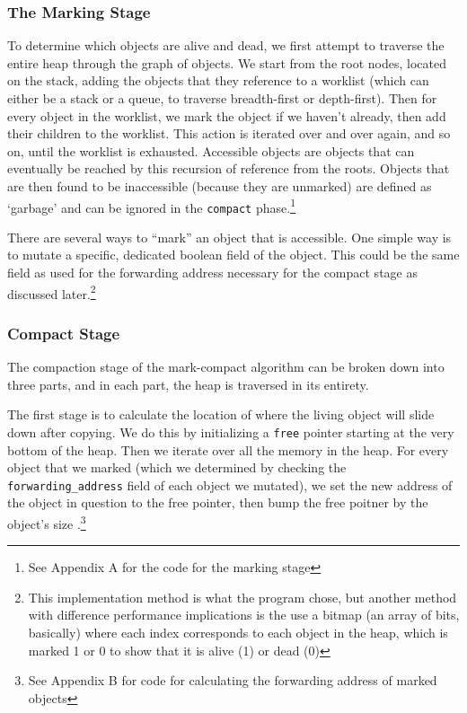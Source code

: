 \documentclass[index]{subfiles}
\begin{document}
\subsubsection{The Marking Stage}

To determine which objects are alive and dead, we first attempt to traverse the entire heap through the graph of objects. We start from the root nodes, located on the stack\cites[Ch~3~Marking]{redhat_openjdk}[Chapter~3]{gc_handbook}, adding the objects that they reference to a worklist (which can either be a stack or a queue, to traverse breadth-first or depth-first). Then for every object in the worklist, we mark the object if we haven't already, then add their children to the worklist. This action is iterated over and over again, and so on, until the worklist is exhausted. Accessible objects are objects that can eventually be reached by this recursion of reference from the roots. Objects that are then found to be inaccessible (because they are unmarked) are defined as `garbage' and can be ignored in the \verb+compact+ phase.\footnote{See Appendix A for the code for the marking stage}

There are several ways to ``mark'' an object that is accessible\cite[Chapter~3]{gc_handbook}. One simple way is to mutate a specific, dedicated boolean field of the object. This could be the same field as used for the forwarding address necessary for the compact stage as discussed later\cite[Chapter~1]{gc_handbook}.\footnote{This implementation method is what the program chose, but another method with difference performance implications is the use a bitmap (an array of bits, basically) where each index corresponds to each object in the heap, which is marked 1 or 0 to show that it is alive (1) or dead (0)\cite[Chapter~3]{gc_handbook}}

\subsubsection{Compact Stage}

The compaction stage of the mark-compact algorithm can be broken down into three parts, and in each part, the heap is traversed in its entirety. 

The first stage is to calculate the location of where the living object will slide down after copying. We do this by initializing a \verb+free+ pointer starting at the very bottom of the heap. Then we iterate over all the memory in the heap. For every object that we marked (which we determined by checking the \verb+forwarding_address+ field of each object we mutated), we set the new address of the object in question to the free pointer, then bump the free poitner by the object's size \cites[Chapter~3]{gc_handbook}[Sections~3.3--3.5]{redhat_openjdk}.\footnote{See Appendix B for code for calculating the forwarding address of marked objects}
\end{document}
